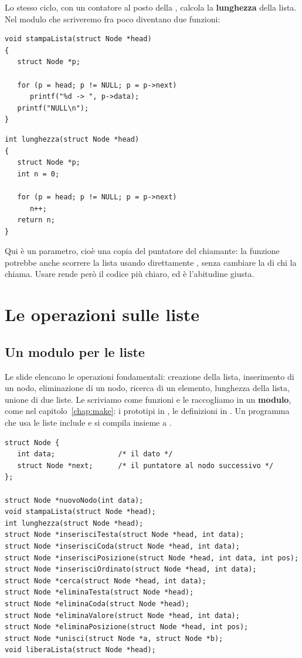 Lo stesso ciclo, con un contatore al posto della , calcola la
\textbf{lunghezza} della lista. Nel modulo che scriveremo fra poco diventano
due funzioni:

\begin{affianco}[0.5][c]
\begin{lstlisting}[style=c, name=lista.c]
void stampaLista(struct Node *head)
{
   struct Node *p;

   for (p = head; p != NULL; p = p->next)
      printf("%d -> ", p->data);
   printf("NULL\n");
}
\end{lstlisting}
\risultato
\begin{lstlisting}[style=c, name=lista.c]
int lunghezza(struct Node *head)
{
   struct Node *p;
   int n = 0;

   for (p = head; p != NULL; p = p->next)
      n++;
   return n;
}
\end{lstlisting}
\end{affianco}

Qui  è un parametro, cioè una copia del puntatore del chiamante:
la funzione potrebbe anche scorrere la lista usando direttamente
, senza cambiare la  di chi la chiama. Usare 
rende però il codice più chiaro, ed è l'abitudine giusta.

\section{Le operazioni sulle liste}

\subsection{Un modulo per le liste}

Le slide elencano le operazioni fondamentali: creazione della lista,
inserimento di un nodo, eliminazione di un nodo, ricerca di un elemento,
lunghezza della lista, unione di due liste. Le scriviamo come funzioni e le
raccogliamo in un \textbf{modulo}, come nel capitolo~\ref{chap:make}: i
prototipi in , le definizioni in . Un programma
che usa le liste include  e si compila insieme a
.

\begin{lstlisting}[style=h, name=lista.h]
struct Node {
   int data;               /* il dato */
   struct Node *next;      /* il puntatore al nodo successivo */
};

struct Node *nuovoNodo(int data);
void stampaLista(struct Node *head);
int lunghezza(struct Node *head);
struct Node *inserisciTesta(struct Node *head, int data);
struct Node *inserisciCoda(struct Node *head, int data);
struct Node *inserisciPosizione(struct Node *head, int data, int pos);
struct Node *inserisciOrdinato(struct Node *head, int data);
struct Node *cerca(struct Node *head, int data);
struct Node *eliminaTesta(struct Node *head);
struct Node *eliminaCoda(struct Node *head);
struct Node *eliminaValore(struct Node *head, int data);
struct Node *eliminaPosizione(struct Node *head, int pos);
struct Node *unisci(struct Node *a, struct Node *b);
void liberaLista(struct Node *head);
\end{lstlisting}

